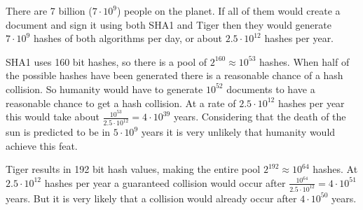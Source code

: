 There are 7 billion ($7 \cdot 10^9$) people on the planet. If all of them would create a document and sign it using both SHA1 and Tiger then they would generate $7 \cdot 10^9$ hashes of both algorithms per day, or about $2.5 \cdot 10^{12}$ hashes per year.

SHA1 uses 160 bit hashes, so there is a pool of $2^{160} \approx 10^{53}$ hashes. When half of the possible hashes have been generated there is a reasonable chance of a hash collision. So humanity would have to generate $10^{52}$ documents to have a reasonable chance to get a hash collision. At a rate of $2.5 \cdot 10^{12}$ hashes per year this would take about $\displaystyle \frac{10^{53}}{2.5 \cdot 10^{12}} = 4 \cdot 10^{39}$ years. Considering that the death of the sun is predicted to be in $5 \cdot 10^{9}$ years it is very unlikely that humanity would achieve this feat.

Tiger results in 192 bit hash values, making the entire pool $2^{192} \approx 10^{64}$ hashes. At $2.5 \cdot 10^{12}$ hashes per year a guaranteed collision would occur after $\displaystyle \frac{10^{64}}{2.5 \cdot 10^{12}} = 4 \cdot 10^{51}$ years. But it is very likely that a collision would already occur after $4 \cdot 10^{50}$ years.